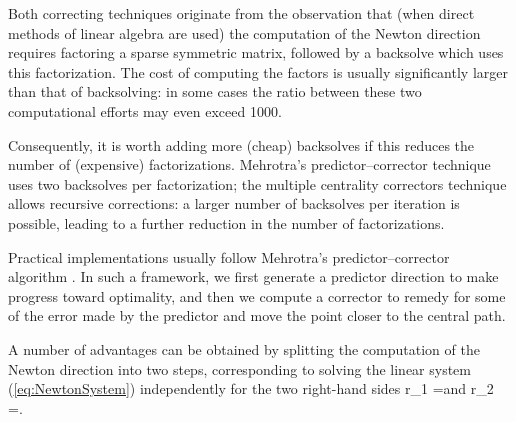 Both correcting techniques originate from the observation that 
(when direct methods of linear algebra are used) the computation 
of the Newton direction requires factoring a sparse symmetric matrix, 
followed by a backsolve which uses this factorization. 
The cost of computing the factors is usually significantly larger than that 
of backsolving: in some cases the ratio between these two computational 
efforts may even exceed 1000. 


Consequently, it is worth adding more (cheap) 
backsolves if this reduces the number of (expensive) factorizations. 
Mehrotra's predictor--corrector technique \cite{Mehrotra92} uses two 
backsolves per factorization; the multiple centrality correctors technique
\cite{Gondzio96} allows recursive corrections: a larger number 
of backsolves per iteration is possible, leading to a further reduction 
in the number of factorizations. 


Practical implementations usually follow Mehrotra's predictor--corrector 
algorithm \cite{Mehrotra92}. In such a framework, we first generate a 
predictor direction to make progress toward optimality, and then we 
compute a corrector to remedy for some of the error made by the predictor
and move the point closer to the central path.


A number of advantages can be obtained by splitting the computation 
of the Newton direction into two steps, corresponding to solving the linear
system (\ref{eq:NewtonSystem}) independently for the two right-hand 
sides 
\be \label{eq:PredictorRhs}
r_1 = \quad \mbox{and} \quad
r_2 =\left[ 
  \begin{array}{c}
    0 \\ 0 \\ \mu e
  \end{array} \right].
\ee

